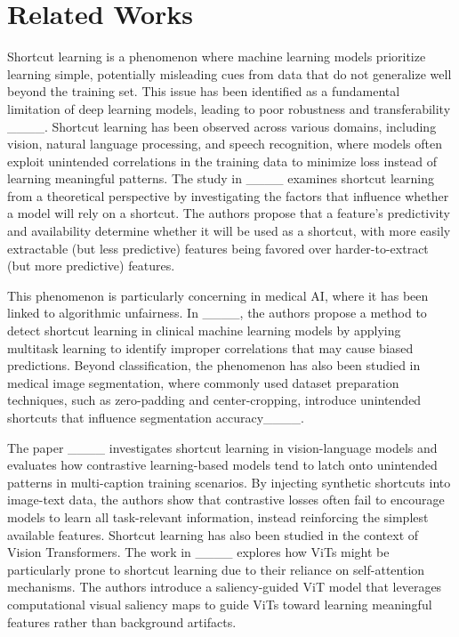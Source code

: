 \section{Related Works}
Shortcut learning is a phenomenon where machine learning models prioritize learning simple, potentially misleading cues from data that do not generalize well beyond the training set. This issue has been identified as a fundamental limitation of deep learning models, leading to poor robustness and transferability ____. Shortcut learning has been observed across various domains, including vision, natural language processing, and speech recognition, where models often exploit unintended correlations in the training data to minimize loss instead of learning meaningful patterns. The study in ____ examines shortcut learning from a theoretical perspective by investigating the factors that influence whether a model will rely on a shortcut. The authors propose that a feature's predictivity and availability determine whether it will be used as a shortcut, with more easily extractable (but less predictive) features being favored over harder-to-extract (but more predictive) features.

This phenomenon is particularly concerning in medical AI, where it has been linked to algorithmic unfairness. In ____, the authors propose a method to detect shortcut learning in clinical machine learning models by applying multitask learning to identify improper correlations that may cause biased predictions. Beyond classification, the phenomenon has also been studied in medical image segmentation, where commonly used dataset preparation techniques, such as zero-padding and center-cropping, introduce unintended shortcuts that influence segmentation accuracy____. 

The paper ____ investigates shortcut learning in vision-language models and evaluates how contrastive learning-based models tend to latch onto unintended patterns in multi-caption training scenarios. By injecting synthetic shortcuts into image-text data, the authors show that contrastive losses often fail to encourage models to learn all task-relevant information, instead reinforcing the simplest available features. Shortcut learning has also been studied in the context of Vision Transformers. The work in ____ explores how ViTs might be particularly prone to shortcut learning due to their reliance on self-attention mechanisms. The authors introduce a saliency-guided ViT model that leverages computational visual saliency maps to guide ViTs toward learning meaningful features rather than background artifacts.


